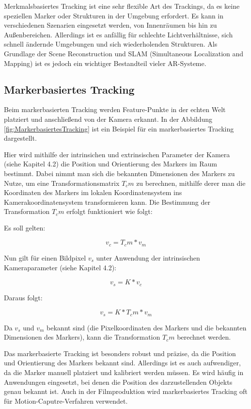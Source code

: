 Merkmalsbasiertes Tracking ist eine sehr flexible Art des Trackings, da es keine speziellen Marker oder Strukturen in der Umgebung erfordert. Es kann in verschiedenen Szenarien eingesetzt werden, von Innenräumen bis hin zu Außenbereichen. Allerdings ist es anfällig für schlechte Lichtverhältnisse, sich schnell ändernde Umgebungen und sich wiederholenden Strukturen. Als Grundlage der Scene Reconstruction und SLAM (Simultaneous Localization and Mapping) ist es jedoch ein wichtiger Bestandteil vieler AR-Systeme.

\subsection{Markerbasiertes Tracking}

Beim markerbasierten Tracking werden Feature-Punkte in der echten Welt platziert und anschließend von der Kamera erkannt. In der Abbildung \ref{fig:MarkerbasiertesTracking} ist ein Beispiel für ein markerbasiertes Tracking dargestellt. 

Hier wird mithilfe der intrinsichen und extrinsischen Parameter der Kamera (siehe Kapitel 4.2) die Position und Orientierung des Markers im Raum bestimmt. Dabei nimmt man sich die bekannten Dimensionen des Markers zu Nutze, um eine Transformationsmatrix \(T_cm\) zu berechnen, mithilfe derer man die Koordinaten des Markers im lokalen Koordinatensystem ins Kamerakoordinatensystem transformieren kann. Die Bestimmung der Transformation \(T_cm\) erfolgt funktioniert wie folgt:

Es soll gelten:

\[ v_c = T_cm * v_m \]

Nun gilt für einen Bildpixel \(v_s\) unter Anwendung der intrinsischen Kameraparameter (siehe Kapitel 4.2):

\[ v_s = K * v_c \]

Daraus folgt:

\[ v_s = K * T_cm * v_m \]

Da \(v_s\) und \(v_m\) bekannt sind (die Pixelkoordinaten des Markers und die bekannten Dimensionen des Markers), kann die Transformation \(T_cm\) berechnet werden.

Das markerbasierte Tracking ist besonders robust und präzise, da die Position und Orientierung des Markers bekannt sind. Allerdings ist es auch aufwendiger, da die Marker manuell platziert und kalibriert werden müssen. Es wird häufig in Anwendungen eingesetzt, bei denen die Position des darzustellenden Objekts genau bekannt ist. Auch in der Filmproduktion wird markerbasiertes Tracking oft für Motion-Caputre-Verfahren verwendet.

